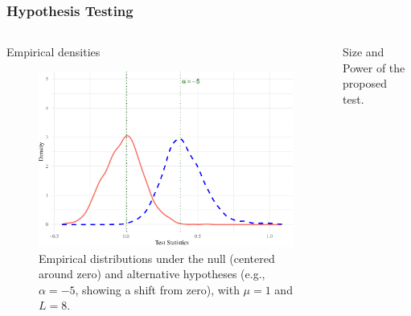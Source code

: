 \documentclass[aspectratio=169,10pt]{beamer}
\begin{document}
\begin{frame} \frametitle{\large{Hypothesis Testing }}\vspace{0.5cm}

 \justifying
\begin{columns}[T,onlytextwidth]
    \begin{column}{.45\textwidth}
			\begin{block}{\small{\quad  \quad Empirical densities}}\justifying
				\begin{figure}[H] 
         \centering
         \includegraphics[scale=0.4]{./Figures/Plot_empirical_test-1} \vspace{-0.4cm}
        \caption*{\tiny{Empirical distributions under the null (centered around zero) and alternative hypotheses (e.g., $\alpha=-5$, showing a shift from zero), with $\mu=1$ and $L=8$.}}
    \end{figure}
		\end{block}
    \end{column}
\begin{column}{.52\textwidth}%
  \begin{block}{\small{\quad \quad Size and Power of the proposed test.}} %
		\justifying
				

\end{block}
\end{column}
\end{columns}
\end{frame}
\end{document}
